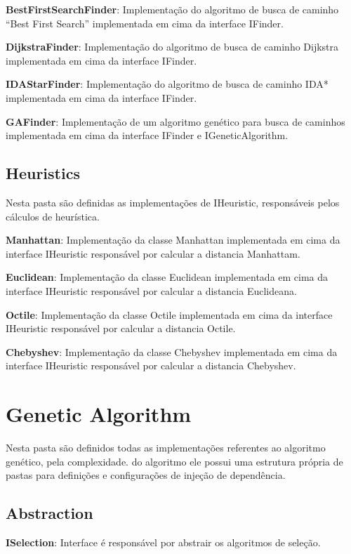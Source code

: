 \textbf{BestFirstSearchFinder}: Implementação do algoritmo de busca de caminho “Best First Search” implementada em cima da interface IFinder.

\textbf{DijkstraFinder}: Implementação do algoritmo de busca de caminho Dijkstra implementada em cima da interface IFinder.

\textbf{IDAStarFinder}: Implementação do algoritmo de busca de caminho IDA* implementada em cima da interface IFinder.

\textbf{GAFinder}: Implementação de um algoritmo genético para busca de caminhos implementada em cima da interface IFinder e IGeneticAlgorithm.

\subsection{Heuristics}

Nesta pasta são definidas as implementações de IHeuristic, responsáveis pelos cálculos de heurística.

\textbf{Manhattan}: Implementação da classe Manhattan implementada em cima da interface IHeuristic responsável por calcular a distancia Manhattam.

\textbf{Euclidean}: Implementação da classe Euclidean implementada em cima da interface IHeuristic responsável por calcular a distancia Euclideana.

\textbf{Octile}: Implementação da classe Octile implementada em cima da interface IHeuristic responsável por calcular a distancia Octile.

\textbf{Chebyshev}: Implementação da classe Chebyshev implementada em cima da interface IHeuristic responsável por calcular a distancia Chebyshev.

\section{Genetic Algorithm}

Nesta pasta são definidos todas as implementações referentes ao algoritmo genético, pela complexidade.
do algoritmo ele possui uma estrutura própria de pastas para definições e configurações de injeção de dependência.

\subsection{Abstraction}

\textbf{ISelection}: Interface é responsável por abstrair os algoritmos de seleção.

